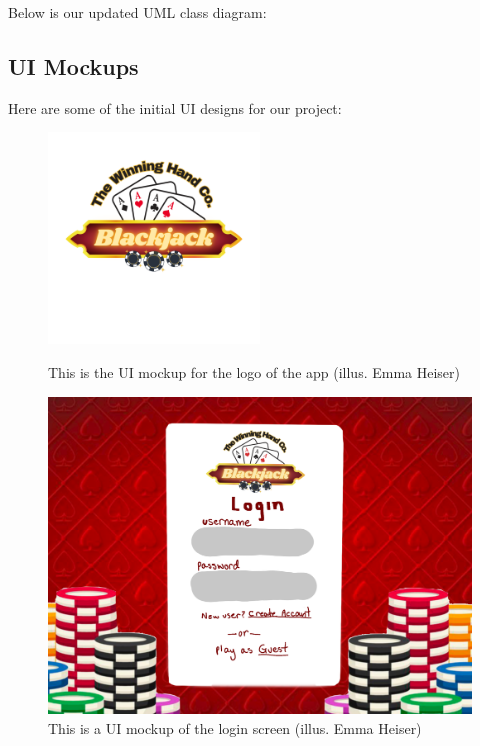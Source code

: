 Below is our updated UML class diagram:

\pagebreak

\subsection{UI Mockups}
Here are some of the initial UI designs for our project:

\begin{figure}[hbt!]
    \centering
    \includegraphics[width=0.5\textwidth]{figures/Blackjack.png} \\
    \caption{This is the UI mockup for the logo of the app (illus. Emma Heiser)}
    \label{fig:logo}
\end{figure}

\begin{figure}[hbt!]
    \centering
    \includegraphics[width=0.75\linewidth]{figures/login.png}
    \caption{This is a UI mockup of the login screen (illus. Emma Heiser)}
    \label{fig:login}
\end{figure}

